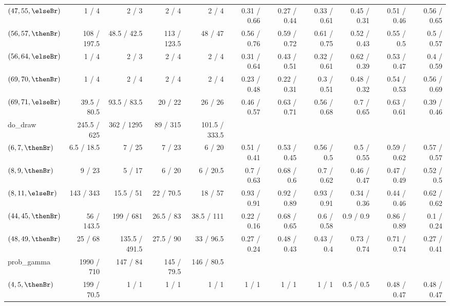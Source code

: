 \begin{table*}
{\begin{tabular}{l|rrrr|r|r|r|r|r|r}
    $(47,55,\elseBr)$ & 1       / 4     & 2    / 3    & 2     / 4     & 2     / 4     & 0.31 / 0.66 & 0.27 / 0.44 & 0.33 / 0.61 & 0.45 / 0.31 & 0.51 / 0.46 & 0.56 / 0.65 \\
    $(56,57,\thenBr)$ & 108     / 197.5 & 48.5 / 42.5 & 113   / 123.5 & 48    / 47    & 0.56 / 0.76 & 0.59 / 0.72 & 0.61 / 0.75 & 0.52 / 0.43 & 0.55 / 0.5  & 0.5 / 0.57 \\
    $(56,64,\elseBr)$ & 1       / 4     & 2    / 3    & 2     / 4     & 2     / 4     & 0.31 / 0.64 & 0.43 / 0.51 & 0.32 / 0.61 & 0.62 / 0.39 & 0.53 / 0.47 & 0.4 / 0.59 \\
    $(69,70,\thenBr)$ & 1       / 4     & 2    / 4    & 2     / 4     & 2     / 4     & 0.23 / 0.48 & 0.22 / 0.31 & 0.3  / 0.51 & 0.48 / 0.32 & 0.54 / 0.53 & 0.56 / 0.69 \\
    $(69,71,\elseBr)$ & 39.5    / 80.5  & 93.5 / 83.5 & 20    / 22    & 26    / 26    & 0.46 / 0.57 & 0.63 / 0.71 & 0.56 / 0.68 & 0.7 / 0.65  & 0.63 / 0.61 & 0.39 / 0.46 \\
    \midrule
    \midrule
    do\_draw             & 245.5 / 625   & 362   / 1295  & 89   / 315  & 101.5 / 333.5  &             &             &             &             &             & \\
    $(6,7,\thenBr)$      & 6.5   / 18.5  & 7     / 25    & 7    / 23   & 6     / 20     & 0.51 / 0.41 & 0.53 / 0.45 & 0.56 / 0.5  & 0.5 / 0.55  & 0.59 / 0.62 & 0.57 / 0.57 \\
    $(8,9,\thenBr)$      & 9     / 23    & 5     / 17    & 6    / 20   & 6     / 20.5   & 0.7 / 0.63  & 0.68 / 0.6  & 0.7 / 0.62  & 0.46 / 0.47 & 0.47 / 0.49 & 0.52 / 0.5 \\
    $(8,11,\elseBr)$     & 143   / 343   & 15.5  / 51    & 22   / 70.5 & 18    / 57     & 0.93 / 0.91 & 0.92 / 0.89 & 0.93 / 0.91 & 0.34 / 0.36 & 0.44 / 0.46 & 0.62 / 0.62\\
    $(44,45,\thenBr)$    & 56    / 143.5 & 199   / 681   & 26.5 / 83   & 38.5  / 111    & 0.22 / 0.16 & 0.68 / 0.65 & 0.6 / 0.58  & 0.9 / 0.9   & 0.86 / 0.89 & 0.1 / 0.24 \\
    $(48,49,\thenBr)$    & 25    / 68    & 135.5 / 491.5 & 27.5 / 90   & 33    / 96.5   & 0.27 / 0.24 & 0.48 / 0.43 & 0.43 / 0.4  & 0.73 / 0.74 & 0.71 / 0.74 & 0.27 / 0.41 \\
    \midrule
    \midrule
    prob\_gamma          & 1990 / 710  & 147 / 84 & 145 / 79.5  & 146 / 80.5 & & & & & & \\
    $(4,5,\thenBr)$      & 199  / 70.5 & 1   / 1  & 1   / 1     & 1   / 1    & 1 / 1 & 1 / 1 & 1 / 1 & 0.5 / 0.5 & 0.48 / 0.47 & 0.48 / 0.47 \\

\end{tabular}}
\end{table*}

